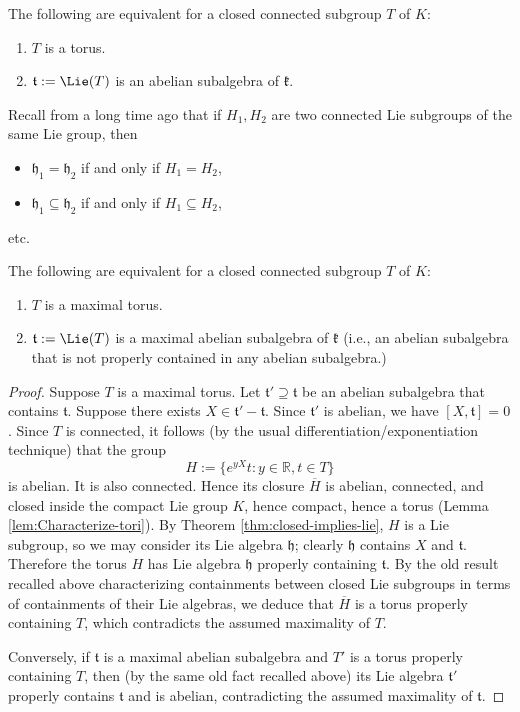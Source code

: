 \documentclass[reqno]{amsart} 
\begin{document}
\begin{exercise}
  The following are equivalent for a closed connected subgroup $T$ of $K$:
  \begin{enumerate}
  \item $T$ is a torus.
  \item $\mathfrak{t} := \Lie(T)$ is an abelian subalgebra of $\mathfrak{k}$.
  \end{enumerate}
\end{exercise}

Recall from a long time ago that if $H_1, H_2$ are two connected Lie subgroups of the same Lie group, then
\begin{itemize}
\item $\mathfrak{h}_1 = \mathfrak{h}_2$ if and only if $H_1 = H_2$,
\item $\mathfrak{h}_1 \subseteq \mathfrak{h}_2$ if and only if $H_1 \subseteq H_2$,
\end{itemize}
etc.
\begin{lemma}\label{lem:maximal-tori-vs-maximal-abelian-subalgebras}
  The following are equivalent for a closed connected subgroup $T$ of $K$:
  \begin{enumerate}
  \item $T$ is a maximal torus.
  \item $\mathfrak{t} := \Lie(T)$ is a maximal abelian subalgebra of $\mathfrak{k}$ (i.e., an abelian subalgebra that is not properly contained in any abelian subalgebra.)
  \end{enumerate}
\end{lemma}
\begin{proof}
  Suppose $T$ is a maximal torus.  Let $\mathfrak{t} ' \supseteq \mathfrak{t}$ be an abelian subalgebra that contains $\mathfrak{t}$.  Suppose there exists $X \in \mathfrak{t}' - \mathfrak{t}$.  Since $\mathfrak{t} '$ is abelian, we have $[X,\mathfrak{t}] = 0$.  Since $T$ is connected, it follows (by the usual differentiation/exponentiation technique) that the group
  \begin{equation*}
    H := \{e^{y X} t : y \in \mathbb{R}, t \in T\}
  \end{equation*}
  is abelian.  It is also connected.  Hence its closure $\overline{H}$ is abelian, connected, and closed inside the compact Lie group $K$, hence compact, hence a torus (Lemma \ref{lem:Characterize-tori}).  By Theorem \ref{thm:closed-implies-lie}, ${H}$ is a Lie subgroup, so we may consider its Lie algebra $\mathfrak{h}$; clearly $\mathfrak{h}$ contains $X$ and $\mathfrak{t}$.  Therefore the torus $H$ has Lie algebra $\mathfrak{h}$ properly containing $\mathfrak{t}$.  By the old result recalled above characterizing containments between closed Lie subgroups in terms of containments of their Lie algebras, we deduce that $\overline{H}$ is a torus properly containing $T$, which contradicts the assumed maximality of $T$.

  Conversely, if $\mathfrak{t}$ is a maximal abelian subalgebra and $T'$ is a torus properly containing $T$, then (by the same old fact recalled above) its Lie algebra $\mathfrak{t} '$ properly contains $\mathfrak{t}$ and is abelian, contradicting the assumed maximality of $\mathfrak{t}$.
\end{proof}
\end{document}
